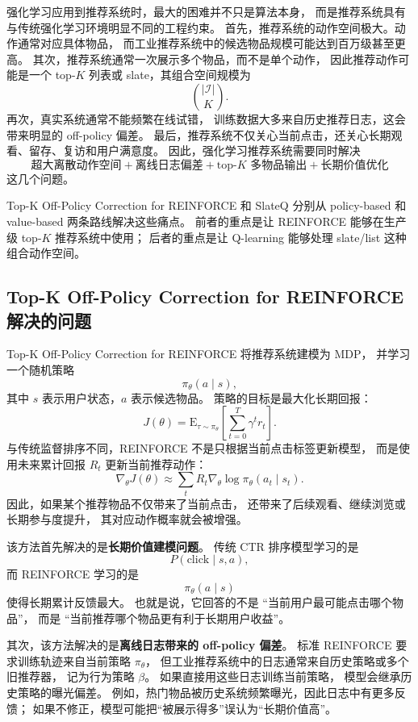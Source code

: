\documentclass[11pt]{ctexart}
\begin{document}
强化学习应用到推荐系统时，最大的困难并不只是算法本身，
而是推荐系统具有与传统强化学习环境明显不同的工程约束。
首先，推荐系统的动作空间极大。动作通常对应具体物品，
而工业推荐系统中的候选物品规模可能达到百万级甚至更高。
其次，推荐系统通常一次展示多个物品，而不是单个动作，
因此推荐动作可能是一个 top-$K$ 列表或 slate，其组合空间规模为
\[
\binom{|\mathcal{I}|}{K}.
\]
再次，真实系统通常不能频繁在线试错，
训练数据大多来自历史推荐日志，这会带来明显的 off-policy 偏差。
最后，推荐系统不仅关心当前点击，还关心长期观看、留存、复访和用户满意度。
因此，强化学习推荐系统需要同时解决
\[
\text{超大离散动作空间}
+
\text{离线日志偏差}
+
\text{top-}K\text{ 多物品输出}
+
\text{长期价值优化}
\]
这几个问题。

Top-K Off-Policy Correction for REINFORCE 和 SlateQ 分别从 policy-based
和 value-based 两条路线解决这些痛点。
前者的重点是让 REINFORCE 能够在生产级 top-$K$ 推荐系统中使用；
后者的重点是让 Q-learning 能够处理 slate/list 这种组合动作空间。

\subsection{Top-K Off-Policy Correction for REINFORCE 解决的问题}

Top-K Off-Policy Correction for REINFORCE 将推荐系统建模为 MDP，
并学习一个随机策略
\[
\pi_{\theta}(a\mid s),
\]
其中 $s$ 表示用户状态，$a$ 表示候选物品。
策略的目标是最大化长期回报：
\[
J(\theta)
=
\mathrm{E}_{\tau\sim \pi_{\theta}}
\left[
\sum_{t=0}^{T}\gamma^t r_t
\right].
\]
与传统监督排序不同，REINFORCE 不是只根据当前点击标签更新模型，
而是使用未来累计回报 $R_t$ 更新当前推荐动作：
\[
\nabla_{\theta}J(\theta)
\approx
\sum_t
R_t
\nabla_{\theta}\log \pi_{\theta}(a_t\mid s_t).
\]
因此，如果某个推荐物品不仅带来了当前点击，
还带来了后续观看、继续浏览或长期参与度提升，
其对应动作概率就会被增强。

该方法首先解决的是\textbf{长期价值建模问题}。
传统 CTR 排序模型学习的是
\[
P(\text{click}\mid s,a),
\]
而 REINFORCE 学习的是
\[
\pi_{\theta}(a\mid s)
\]
使得长期累计反馈最大。
也就是说，它回答的不是
``当前用户最可能点击哪个物品''，
而是
``当前推荐哪个物品更有利于长期用户收益''。

其次，该方法解决的是\textbf{离线日志带来的 off-policy 偏差}。
标准 REINFORCE 要求训练轨迹来自当前策略 $\pi_{\theta}$，
但工业推荐系统中的日志通常来自历史策略或多个旧推荐器，
记为行为策略 $\beta$。
如果直接用这些日志训练当前策略，
模型会继承历史策略的曝光偏差。
例如，热门物品被历史系统频繁曝光，因此日志中有更多反馈；
如果不修正，模型可能把``被展示得多''误认为``长期价值高''。
\end{document}
